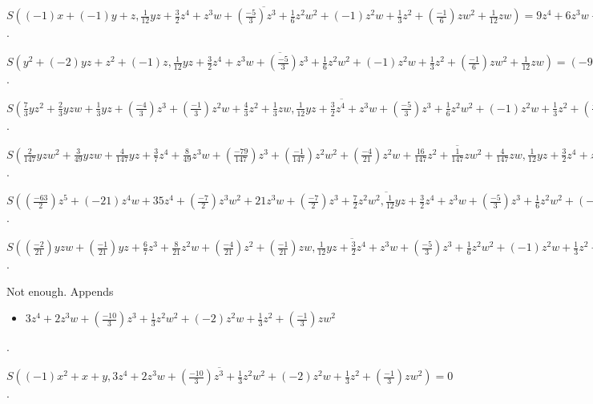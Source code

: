 $\overline{S((-1)x+(-1)y+z, \frac{1}{12}yz+\frac{3}{2}z^{4}+z^{3}w+(\frac{-5}{3})z^{3}+\frac{1}{6}z^{2}w^{2}+(-1)z^{2}w+\frac{1}{3}z^{2}+(\frac{-1}{6})zw^{2}+\frac{1}{12}zw)} = 9z^{4}+6z^{3}w+(-10)z^{3}+z^{2}w^{2}+(-6)z^{2}w+z^{2}+(-1)zw^{2}$.

$\overline{S(y^{2}+(-2)yz+z^{2}+(-1)z, \frac{1}{12}yz+\frac{3}{2}z^{4}+z^{3}w+(\frac{-5}{3})z^{3}+\frac{1}{6}z^{2}w^{2}+(-1)z^{2}w+\frac{1}{3}z^{2}+(\frac{-1}{6})zw^{2}+\frac{1}{12}zw)} = (-9)z^{4}+(-6)z^{3}w+10z^{3}+(-1)z^{2}w^{2}+6z^{2}w+(-1)z^{2}+zw^{2}$.

$\overline{S(\frac{7}{3}yz^{2}+\frac{2}{3}yzw+\frac{1}{3}yz+(\frac{-4}{3})z^{3}+(\frac{-1}{3})z^{2}w+\frac{4}{3}z^{2}+\frac{1}{3}zw, \frac{1}{12}yz+\frac{3}{2}z^{4}+z^{3}w+(\frac{-5}{3})z^{3}+\frac{1}{6}z^{2}w^{2}+(-1)z^{2}w+\frac{1}{3}z^{2}+(\frac{-1}{6})zw^{2}+\frac{1}{12}zw)} = 0$.

$\overline{S(\frac{2}{147}yzw^{2}+\frac{3}{49}yzw+\frac{4}{147}yz+\frac{3}{7}z^{4}+\frac{8}{49}z^{3}w+(\frac{-79}{147})z^{3}+(\frac{-1}{147})z^{2}w^{2}+(\frac{-4}{21})z^{2}w+\frac{16}{147}z^{2}+\frac{1}{147}zw^{2}+\frac{4}{147}zw, \frac{1}{12}yz+\frac{3}{2}z^{4}+z^{3}w+(\frac{-5}{3})z^{3}+\frac{1}{6}z^{2}w^{2}+(-1)z^{2}w+\frac{1}{3}z^{2}+(\frac{-1}{6})zw^{2}+\frac{1}{12}zw)} = (-18)z^{4}w^{2}+36z^{4}+(-12)z^{3}w^{3}+20z^{3}w^{2}+15z^{3}w+(-4)z^{3}+(-2)z^{2}w^{4}+12z^{2}w^{3}+(-4)z^{2}w^{2}+z^{2}w+2zw^{4}+(-1)zw^{3}$.

$\overline{S((\frac{-63}{2})z^{5}+(-21)z^{4}w+35z^{4}+(\frac{-7}{2})z^{3}w^{2}+21z^{3}w+(\frac{-7}{2})z^{3}+\frac{7}{2}z^{2}w^{2}, \frac{1}{12}yz+\frac{3}{2}z^{4}+z^{3}w+(\frac{-5}{3})z^{3}+\frac{1}{6}z^{2}w^{2}+(-1)z^{2}w+\frac{1}{3}z^{2}+(\frac{-1}{6})zw^{2}+\frac{1}{12}zw)} = 0$.

$\overline{S((\frac{-2}{21})yzw+(\frac{-1}{21})yz+\frac{6}{7}z^{3}+\frac{8}{21}z^{2}w+(\frac{-4}{21})z^{2}+(\frac{-1}{21})zw, \frac{1}{12}yz+\frac{3}{2}z^{4}+z^{3}w+(\frac{-5}{3})z^{3}+\frac{1}{6}z^{2}w^{2}+(-1)z^{2}w+\frac{1}{3}z^{2}+(\frac{-1}{6})zw^{2}+\frac{1}{12}zw)} = (-18)z^{4}w+(-9)z^{4}+(-12)z^{3}w^{2}+14z^{3}w+z^{3}+(-2)z^{2}w^{3}+11z^{2}w^{2}+(-2)z^{2}w+2zw^{3}$.

Not enough.  Appends \begin{itemize}
\item $3z^{4}+2z^{3}w+(\frac{-10}{3})z^{3}+\frac{1}{3}z^{2}w^{2}+(-2)z^{2}w+\frac{1}{3}z^{2}+(\frac{-1}{3})zw^{2}$
\end{itemize}  .


$\overline{S((-1)x^{2}+x+y, 3z^{4}+2z^{3}w+(\frac{-10}{3})z^{3}+\frac{1}{3}z^{2}w^{2}+(-2)z^{2}w+\frac{1}{3}z^{2}+(\frac{-1}{3})zw^{2})} = 0$.

